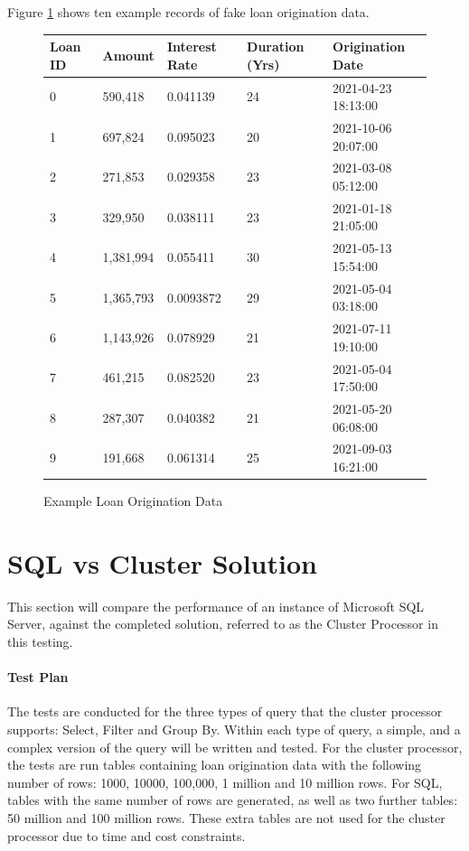 Figure \ref{fig:fake-loan-data} shows ten example records of fake loan origination data.

\begin{figure}[h]
	\centering
	\begin{tabular}{| l | l | l | l | l |}
		\hline
		\textbf{Loan ID} & \textbf{Amount} & \textbf{Interest Rate} & \textbf{Duration (Yrs)} & \textbf{Origination Date} \\ \hline 
		0 & 590,418 & 0.041139 & 24 & 2021-04-23 18:13:00   \\ \hline
		1 & 697,824 & 0.095023 & 20 & 2021-10-06 20:07:00    \\ \hline
		2 & 271,853 & 0.029358 & 23 & 2021-03-08 05:12:00    \\ \hline
		3 & 329,950 & 0.038111 & 23 & 2021-01-18 21:05:00    \\ \hline
		4 & 1,381,994 & 0.055411 & 30 & 2021-05-13 15:54:00  \\ \hline
		5 & 1,365,793 & 0.0093872 & 29 & 2021-05-04 03:18:00  \\ \hline
		6 & 1,143,926 & 0.078929 & 21 & 2021-07-11 19:10:00   \\ \hline
		7 & 461,215 & 0.082520 & 23 & 2021-05-04 17:50:00    \\ \hline
		8 & 287,307 & 0.040382 & 21 & 2021-05-20 06:08:00   \\ \hline
		9 & 191,668 & 0.061314 & 25 & 2021-09-03 16:21:00    \\ \hline
	\end{tabular}
	\caption{Example Loan Origination Data}
	\label{fig:fake-loan-data}
\end{figure}

\section{SQL vs Cluster Solution}
This section will compare the performance of an instance of Microsoft SQL Server, against the completed solution, referred to as the Cluster Processor in this testing. 

\paragraph{Test Plan}
The tests are conducted for the three types of query that the cluster processor supports: Select, Filter and Group By. Within each type of query, a simple, and a complex version of the query will be written and tested. For the cluster processor, the tests are run tables containing loan origination data with the following number of rows: 1000, 10000, 100,000, 1 million and 10 million rows. For SQL, tables with the same number of rows are generated, as well as two further tables: 50 million and 100 million rows. These extra tables are not used for the cluster processor due to time and cost constraints.

